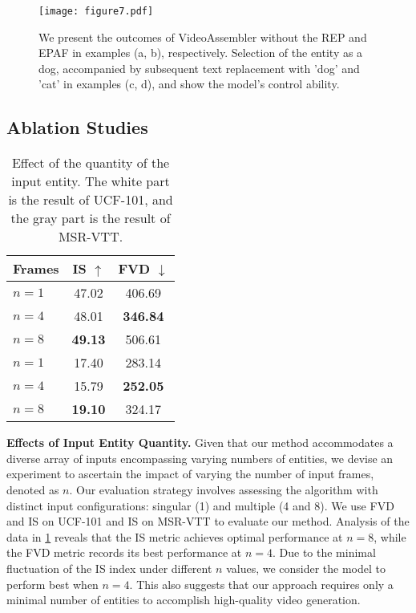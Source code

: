 \begin{figure*}[ht]
\centering
\texttt{[image: figure7.pdf]}
\caption{We present the outcomes of VideoAssembler without the REP and EPAF in examples (a, b), respectively. 
Selection of the entity as a dog, accompanied by subsequent text replacement with 'dog' and 'cat' in examples (c, d), and show the model's control ability.
}
\label{fig: ablation}
\end{figure*}

\subsection{Ablation Studies}

\begin{table}[ht]
    \setlength{\tabcolsep}{8.0mm}
    \centering
    \begin{tabular}{lcc}
       \toprule
       Frames &  IS $\uparrow$ & FVD $\downarrow$ \\
       \midrule
       $n=1$ & 47.02 & 406.69 \\
       $n=4$ & 48.01 & \textbf{346.84} \\
       $n=8$ & \textbf{49.13} & 506.61 \\
       \midrule
       \rowcolor{gray!20}
       $n=1$ & 17.40 & 283.14 \\
       \rowcolor{gray!20}
       $n=4$ & 15.79 & \textbf{252.05} \\
       \rowcolor{gray!20}
       $n=8$ & \textbf{19.10} & 324.17 \\
       \bottomrule
    \end{tabular}
    \caption{Effect of the quantity of the input entity. The white part is the result of UCF-101, and the gray part is the result of MSR-VTT.}
    \label{tab:quantity-effect}
\end{table}

\noindent
\textbf{Effects of Input Entity Quantity.} 
Given that our method accommodates a diverse array of inputs encompassing varying numbers of entities, we devise an experiment to ascertain the impact of varying the number of input frames, denoted as $n$. Our evaluation strategy involves assessing the algorithm with distinct input configurations: singular (1) and multiple (4 and 8). We use FVD and IS on UCF-101 and IS on MSR-VTT to evaluate our method. Analysis of the data in \cref{tab:quantity-effect} reveals that the IS metric achieves optimal performance at $n=8$, while the FVD metric records its best performance at $n=4$. Due to the minimal fluctuation of the IS index under different $n$ values, we consider the model to perform best when $n=4$. This also suggests that our approach requires only a minimal number of entities to accomplish high-quality video generation.

